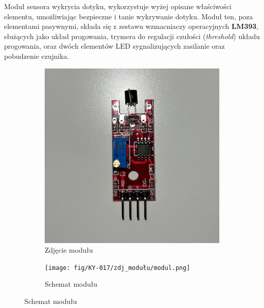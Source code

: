 \documentclass[11pt, a4paper]{article}
\begin{document}
\vspace{0.75cm}

Moduł sensora wykrycia dotyku, wykorzystuje wyżej opisane właściwości elementu, umożliwiając bezpieczne i tanie wykrywanie dotyku. Moduł ten, poza elementami pasywnymi, składa się z zestawu wzmacniaczy operacyjnych \textbf{LM393}, służących jako układ progowania, trymera do regulacji czułości (\textit{threshold}) układu progowania, oraz dwóch elementów LED sygnalizujących zasilanie oraz pobudzenie czujnika. 

\begin{figure}[h]
\centering
\begin{subfigure}{.5\textwidth}
\centering
\includegraphics[width=.7\linewidth]{fig/KY-036/283965536_377900227645925_1471273661785834276_n.jpg}
\caption{Zdjęcie modułu}
\label{fig:_zdjecie_modulu}
\end{subfigure}%
\begin{subfigure}{.5\textwidth}
\centering
\texttt{[image: fig/KY-017/zdj\_modułu/modul.png]}
\caption{Schemat modułu}

\end{subfigure}
\label{fig:modul}
\end{figure}
\vspace{0.5cm}
\end{document}
